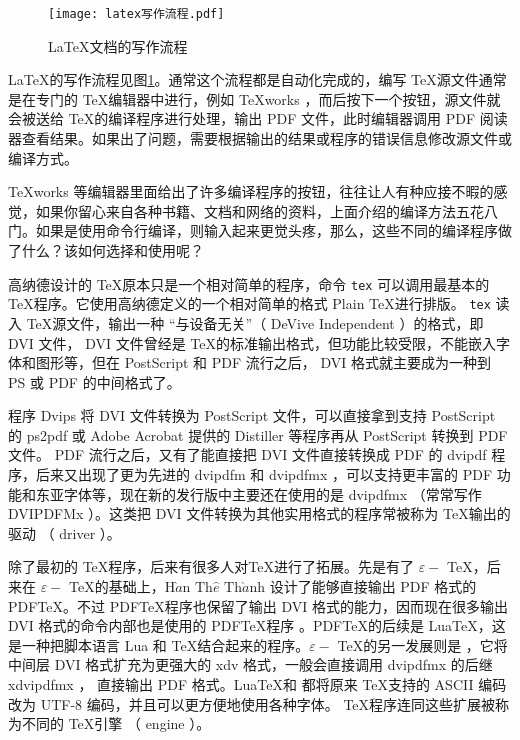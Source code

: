 \begin{figure}[H]
    \centering
    \texttt{[image: latex写作流程.pdf]}
    \caption{\LaTeX 文档的写作流程}
    \label{fig:5}
\end{figure}

\LaTeX 的写作流程见图\ref{fig:5}。通常这个流程都是自动化完成的，编写 \TeX 源文件通常是在专门的 \TeX 编辑器中进行，例如 TeXworks ，而后按下一个按钮，源文件就会被送给 \TeX 的编译程序进行处理，输出 PDF 文件，此时编辑器调用 PDF 阅读器查看结果。如果出了问题，需要根据输出的结果或程序的错误信息修改源文件或编译方式。

{
    \qquad TeXworks 等编辑器里面给出了许多编译程序的按钮，往往让人有种应接不暇的感觉，如果你留心来自各种书籍、文档和网络的资料，上面介绍的编译方法五花八门。如果是使用命令行编译，则输入起来更觉头疼，那么，这些不同的编译程序做了什么？该如何选择和使用呢？

    \qquad 高纳德设计的 \TeX 原本只是一个相对简单的程序，命令 \lstinline{tex} 可以调用最基本的 \TeX 程序。它使用高纳德定义的一个相对简单的格式 Plain \TeX 进行排版。 \lstinline{tex} 读入 \TeX 源文件，输出一种 “与设备无关”（  DeVive Independent ）的格式，即 DVI 文件， DVI 文件曾经是 \TeX 的标准输出格式，但功能比较受限，不能嵌入字体和图形等，但在 PostScript 和 PDF 流行之后， DVI 格式就主要成为一种到 PS 或 PDF 的中间格式了。

    \qquad 程序 Dvips 将 DVI 文件转换为 PostScript 文件，可以直接拿到支持 PostScript 的 ps2pdf 或 Adobe Acrobat 提供的 Distiller 等程序再从 PostScript 转换到 PDF 文件。 PDF 流行之后，又有了能直接把 DVI 文件直接转换成 PDF 的 dvipdf 程序，后来又出现了更为先进的 dvipdfm 和 dvipdfmx ，可以支持更丰富的 PDF 功能和东亚字体等，现在新的发行版中主要还在使用的是 dvipdfmx （常常写作 DVIPDFMx ）。这类把 DVI 文件转换为其他实用格式的程序常被称为 \TeX 输出的驱动 （ driver ）。

    \qquad 除了最初的 \TeX 程序，后来有很多人对\TeX 进行了拓展。先是有了 $\varepsilon-$ \TeX ，后来在 $\varepsilon-$ \TeX 的基础上，$\text{H}\grave{a}\text{n Th}\hat{e} \text{ Th}\grave{a}\text{nh} $ 设计了能够直接输出 PDF 格式的 PDF\TeX 。不过  PDF\TeX 程序也保留了输出 DVI 格式的能力，因而现在很多输出 DVI 格式的命令内部也是使用的 PDF\TeX 程序 。PDF\TeX 的后续是 Lua\TeX，这是一种把脚本语言 Lua 和 \TeX 结合起来的程序。$\varepsilon-$ \TeX 的另一发展则是 \XeTeX ，它将中间层 DVI 格式扩充为更强大的 xdv 格式，一般会直接调用 dvipdfmx 的后继 xdvipdfmx ， 直接输出 PDF 格式。Lua\TeX 和 \XeTeX 都将原来 \TeX 支持的 ASCII 编码改为 UTF-8 编码，并且可以更方便地使用各种字体。 \TeX 程序连同这些扩展被称为不同的 \TeX 引擎 （ engine ）。

}
